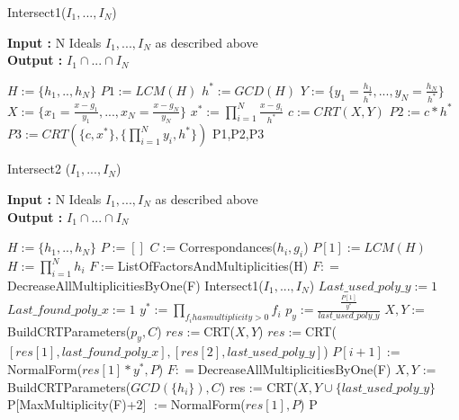 \documentclass{article}
\begin{document}
\begin{algorithm}
    \caption{Intersect1($I_{1},...,I_{N}$)}\label{alg:intersect-2-ideals}
    \textbf{Input : } N Ideals $I_{1},...,I_{N}$ as described above \\
    \textbf{Output : }$I_{1} \cap ...\cap I_ {N}$
\begin{algorithmic}
    \State $H := \{h_{1},..,h_{N}\}$
    \State $P1 := LCM(H)$
    \State $h^{*} := GCD(H)$
    \State $Y:= \{y_{1}= \frac{h_{1}}{h^{*}},...,y_{N}= \frac{h_{N}}{h^{*}}\}$
    \State $X := \{x_{1} = \frac{x-g_{1}}{y_{1}},...,x_{N} =\frac{x-g_{N}}{y_{N}}\}$
    \State $x^{*} := \prod^{N}_{i=1} \frac{x-g_{i}}{h^{*}}$
    \State $c:= CRT(X,Y)$
    \State $P2 := c*h^{*}$
    \State $P3 := CRT(\{c,x^{*}\},\{\prod^{N}_{i=1} y_{i}, h^{*}\})$
    \State \Return P1,P2,P3
\end{algorithmic}
\end{algorithm}

\begin{algorithm}
    \caption{Intersect2 ($I_{1},...,I_{N}$)}\label{alg:intersect-2-ideals}
    \textbf{Input : } N Ideals $I_{1},...,I_{N}$ as described above \\
    \textbf{Output : }$I_{1} \cap ...\cap I_ {N}$
\begin{algorithmic}
    \State $H := \{h_{1},..,h_{N}\}$
    \State $P:=[]$
    \State $C := $Correspondances($h_{i},g_{i}$)
    \State $P[1] := LCM(H)$
    \State $H := \prod^{N}_{i=1} h_{i}$
    \State $F:= $ListOfFactorsAndMultiplicities(H)
    \State $F: = $DecreaseAllMultiplicitiesByOne(F)
        \State \Return Intersect1($I_{1},...,I_{N}$)
    \EndIf
    \State $Last\_used\_poly\_y := 1$
    \State $Last\_found\_poly\_x := 1$
        \State $y^{*}:= \prod_{f_{i} has multiplicity > 0} f_{i}$
        \State $p_y:=\frac{\frac{P[1]}{y^{*}}}{last\_used\_poly\_y}$
        \State $X, Y:=$BuildCRTParameters($p_y, C$)
        \State $res := $CRT($X,Y$)
            \State $res := $CRT($[res[1],last\_found\_poly\_x],[res[2],last\_used\_poly\_y]$)
        \EndIf
        \State $P[i+1] := $NormalForm($res[1]*y^{*},P$)
        \State $F: = $DecreaseAllMultiplicitiesByOne(F)
    \EndFor
    \State $X,Y$ := BuildCRTParameters($GCD(\{h_{i}\}),C$)
    \State res := CRT($X,Y\cup\{last\_used\_poly\_y\}$
    \State P[MaxMultiplicity(F)+2] $:= $NormalForm($res[1],P$)
    \State \Return P

\end{algorithmic}
\end{algorithm}
\nocite{*}
\printbibliography
\end{document}
